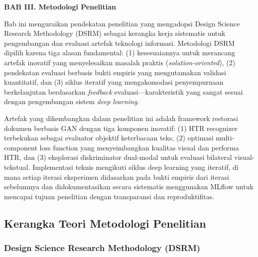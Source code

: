 \documentclass[12pt,a4paper]{article}
\begin{document}
\setcounter{page}{61}

\sloppy

\vspace{2cm}
\begin{center}
{\fontsize{14}{16.8}\selectfont\textbf{BAB III. Metodologi Penelitian}}\\[1em]
\end{center}
\label{sec:metodologi}
\setcounter{section}{3}
\setcounter{subsection}{0}
\vspace{2em}

Bab ini menguraikan pendekatan penelitian yang mengadopsi Design Science Research Methodology (DSRM) sebagai kerangka kerja sistematis untuk pengembangan dan evaluasi artefak teknologi informasi. Metodologi DSRM dipilih karena tiga alasan fundamental: (1) kesesuaiannya untuk merancang artefak inovatif yang menyelesaikan masalah praktis (\textit{solution-oriented}), (2) pendekatan evaluasi berbasis bukti empiris yang mengutamakan validasi kuantitatif, dan (3) siklus iteratif yang mengakomodasi penyempurnaan berkelanjutan berdasarkan \textit{feedback} evaluasi---karakteristik yang sangat sesuai dengan pengembangan sistem \textit{deep learning}.

Artefak yang dikembangkan dalam penelitian ini adalah framework restorasi dokumen berbasis GAN dengan tiga komponen inovatif: (1) HTR recognizer terbekukan sebagai evaluator objektif keterbacaan teks, (2) optimasi multi-component loss function yang menyeimbangkan kualitas visual dan performa HTR, dan (3) eksplorasi diskriminator dual-modal untuk evaluasi bilateral visual-tekstual. Implementasi teknis mengikuti siklus deep learning yang iteratif, di mana setiap iterasi eksperimen didasarkan pada bukti empiris dari iterasi sebelumnya dan didokumentasikan secara sistematis menggunakan MLflow untuk mencapai tujuan penelitian dengan transparansi dan reproduktifitas.
\vspace{1em}

\subsection{Kerangka Teori Metodologi Penelitian}
\label{subsec:kerangka-teori}
\vspace{0.8em}

\subsubsection{Design Science Research Methodology (DSRM)}
\end{document}
